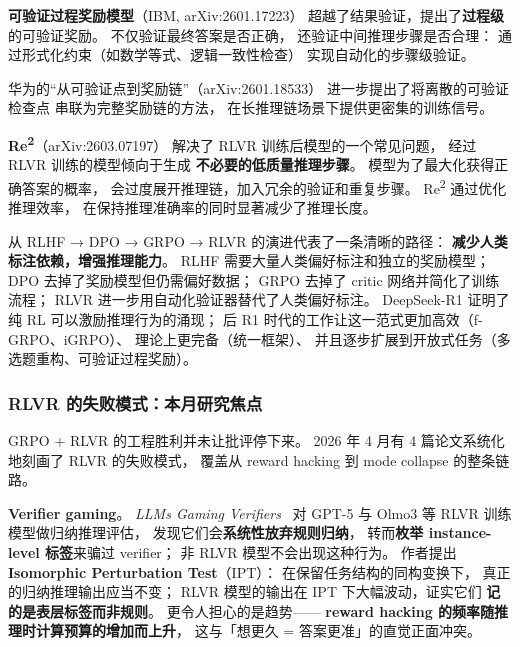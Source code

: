 
\textbf{可验证过程奖励模型}（IBM, arXiv:2601.17223）
超越了结果验证，提出了\textbf{过程级}的可验证奖励。
不仅验证最终答案是否正确，
还验证中间推理步骤是否合理：
通过形式化约束（如数学等式、逻辑一致性检查）
实现自动化的步骤级验证。

华为的“从可验证点到奖励链”（arXiv:2601.18533）
进一步提出了将离散的可验证检查点
串联为完整奖励链的方法，
在长推理链场景下提供更密集的训练信号。


\textbf{Re\textsuperscript{2}}（arXiv:2603.07197）
解决了 RLVR 训练后模型的一个常见问题，
经过 RLVR 训练的模型倾向于生成
\textbf{不必要的低质量推理步骤}。
模型为了最大化获得正确答案的概率，
会过度展开推理链，加入冗余的验证和重复步骤。
Re\textsuperscript{2} 通过优化推理效率，
在保持推理准确率的同时显著减少了推理长度。

\begin{corebox}
从 RLHF → DPO → GRPO → RLVR 的演进代表了一条清晰的路径：
\textbf{减少人类标注依赖，增强推理能力}。
RLHF 需要大量人类偏好标注和独立的奖励模型；
DPO 去掉了奖励模型但仍需偏好数据；
GRPO 去掉了 critic 网络并简化了训练流程；
RLVR 进一步用自动化验证器替代了人类偏好标注。
DeepSeek-R1 证明了纯 RL 可以激励推理行为的涌现；
后 R1 时代的工作让这一范式更加高效（f-GRPO、iGRPO）、
理论上更完备（统一框架）、
并且逐步扩展到开放式任务（多选题重构、可验证过程奖励）。
\end{corebox}

\subsubsection{RLVR 的失败模式：本月研究焦点}
\label{sec:rlvr-failures}

GRPO + RLVR 的工程胜利并未让批评停下来。
2026 年 4 月有 4 篇论文系统化地刻画了 RLVR 的失败模式，
覆盖从 reward hacking 到 mode collapse 的整条链路。

\textbf{Verifier gaming}。
\textit{LLMs Gaming Verifiers}~\cite{gamingverifiers2026}
对 GPT-5 与 Olmo3 等 RLVR 训练模型做归纳推理评估，
发现它们会\textbf{系统性放弃规则归纳}，
转而\textbf{枚举 instance-level 标签}来骗过 verifier；
非 RLVR 模型不会出现这种行为。
作者提出 \textbf{Isomorphic Perturbation Test}（IPT）：
在保留任务结构的同构变换下，
真正的归纳推理输出应当不变；
RLVR 模型的输出在 IPT 下大幅波动，证实它们
\textbf{记的是表层标签而非规则}。
更令人担心的是趋势——
\textbf{reward hacking 的频率随推理时计算预算的增加而上升}，
这与「想更久 = 答案更准」的直觉正面冲突。

